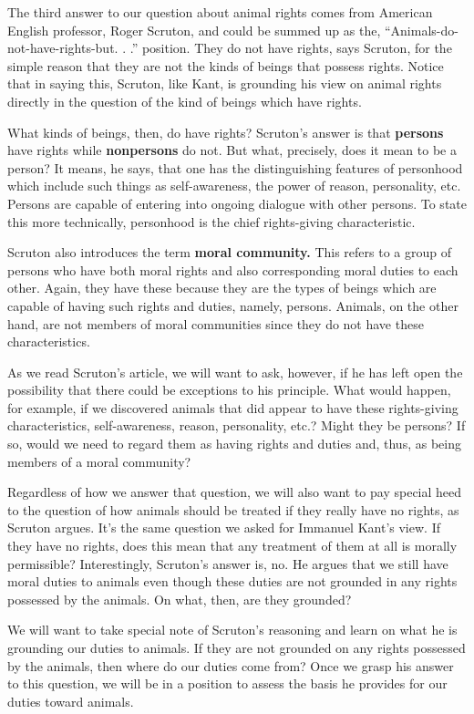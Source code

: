 \documentclass[
]{book}
\begin{document}
The third answer to our question about animal rights comes from American English professor, Roger Scruton, and could be summed up as the, ``Animals-do-not-have-rights-but. . .'' position. They do not have rights, says Scruton, for the simple reason that they are not the kinds of beings that possess rights. Notice that in saying this, Scruton, like Kant, is grounding his view on animal rights directly in the question of the kind of beings which have rights.

What kinds of beings, then, do have rights? Scruton's answer is that \textbf{persons} have rights while \textbf{nonpersons} do not. But what, precisely, does it mean to be a person? It means, he says, that one has the distinguishing features of personhood which include such things as self-awareness, the power of reason, personality, etc. Persons are capable of entering into ongoing dialogue with other persons. To state this more technically, personhood is the chief rights-giving characteristic.

Scruton also introduces the term \textbf{moral community.} This refers to a group of persons who have both moral rights and also corresponding moral duties to each other. Again, they have these because they are the types of beings which are capable of having such rights and duties, namely, persons. Animals, on the other hand, are not members of moral communities since they do not have these characteristics.

As we read Scruton's article, we will want to ask, however, if he has left open the possibility that there could be exceptions to his principle. What would happen, for example, if we discovered animals that did appear to have these rights-giving characteristics, self-awareness, reason, personality, etc.? Might they be persons? If so, would we need to regard them as having rights and duties and, thus, as being members of a moral community?

Regardless of how we answer that question, we will also want to pay special heed to the question of how animals should be treated if they really have no rights, as Scruton argues. It's the same question we asked for Immanuel Kant's view. If they have no rights, does this mean that any treatment of them at all is morally permissible? Interestingly, Scruton's answer is, no. He argues that we still have moral duties to animals even though these duties are not grounded in any rights possessed by the animals. On what, then, are they grounded?

We will want to take special note of Scruton's reasoning and learn on what he is grounding our duties to animals. If they are not grounded on any rights possessed by the animals, then where do our duties come from? Once we grasp his answer to this question, we will be in a position to assess the basis he provides for our duties toward animals.
\end{document}
